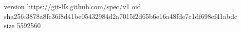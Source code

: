 version https://git-lfs.github.com/spec/v1
oid sha256:3878a8fc36f8d41be05432984d2a7015f2d65b6e16a48fde7c1df698cf41abdc
size 5592560

